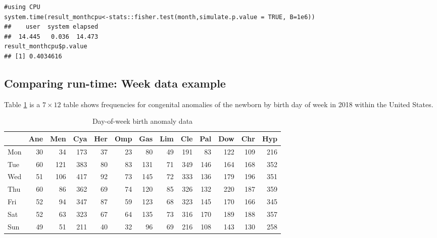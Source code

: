 \documentclass[article,nojss]{jss}\usepackage[]{graphicx}\usepackage[]{color}
\makeatletter
\newenvironment{kframe}{%
 \def\at@end@of@kframe{}%
 \ifinner\ifhmode%
  \def\at@end@of@kframe{\end{minipage}}%
  \begin{minipage}{\columnwidth}%
 \fi\fi%
 \def\FrameCommand##1{\hskip\@totalleftmargin \hskip-\fboxsep
 \colorbox{shadecolor}{##1}\hskip-\fboxsep
     \hskip-\linewidth \hskip-\@totalleftmargin \hskip\columnwidth}%
 \MakeFramed {\advance\hsize-\width
   \@totalleftmargin\z@ \linewidth\hsize
   \@setminipage}}%
 {\par\unskip\endMakeFramed%
 \at@end@of@kframe}
\newenvironment{knitrout}{}{} %
\makeatother
\begin{document}
 
\begin{knitrout}
\color{fgcolor}\begin{kframe}
\begin{verbatim}
#using CPU
system.time(result_monthcpu<-stats::fisher.test(month,simulate.p.value = TRUE, B=1e6))
##    user  system elapsed 
##  14.445   0.036  14.473
result_monthcpu$p.value
## [1] 0.4034616
\end{verbatim}
\end{kframe}
\end{knitrout}



\subsection{Comparing run-time: Week data example}\label{fisher_week}
Table \ref{tab:week} is a $7 \times 12$ table shows frequencies for congenital anomalies of the newborn by birth day of week in 2018 within the United States. 


\begin{knitrout}
\color{fgcolor}\begin{table}[H]

\caption{\label{tab:weekdata}Day-of-week birth anomaly data\label{tab:week}}
\centering
\begin{tabular}[t]{lrrrrrrrrrrrr}
\toprule
  & Ane & Men & Cya & Her & Omp & Gas & Lim & Cle & Pal & Dow & Chr & Hyp\\
\midrule
Mon & 30 & 34 & 173 & 37 & 23 & 80 & 49 & 191 & 83 & 122 & 109 & 216\\
Tue & 60 & 121 & 383 & 80 & 83 & 131 & 71 & 349 & 146 & 164 & 168 & 352\\
Wed & 51 & 106 & 417 & 92 & 73 & 145 & 72 & 333 & 136 & 179 & 196 & 351\\
Thu & 60 & 86 & 362 & 69 & 74 & 120 & 85 & 326 & 132 & 220 & 187 & 359\\
Fri & 52 & 94 & 347 & 87 & 59 & 123 & 68 & 323 & 145 & 170 & 166 & 345\\
Sat & 52 & 63 & 323 & 67 & 64 & 135 & 73 & 316 & 170 & 189 & 188 & 357\\
Sun & 49 & 51 & 211 & 40 & 32 & 96 & 69 & 216 & 108 & 143 & 130 & 258\\
\bottomrule
\end{tabular}
\end{table}

\end{knitrout}
\end{document}
